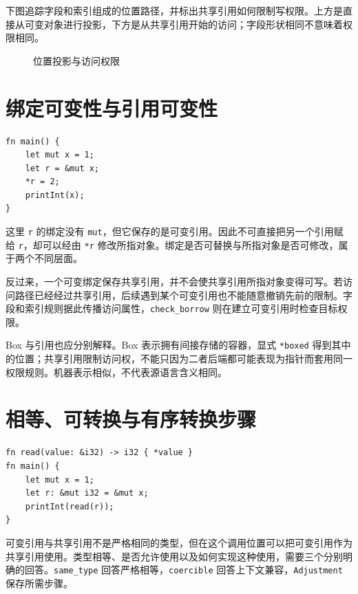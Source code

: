 下图追踪字段和索引组成的位置路径，并标出共享引用如何限制写权限。上方是直接从可变对象进行投影，下方是从共享引用开始的访问；字段形状相同不意味着权限相同。
\begin{figure}[htbp]
\centering
{}
\caption{位置投影与访问权限}
\end{figure}

\section{绑定可变性与引用可变性}
\begin{lstlisting}[language=Rustless]
fn main() {
    let mut x = 1;
    let r = &mut x;
    *r = 2;
    printInt(x);
}
\end{lstlisting}
这里 \lstinline[language=Rustless]|r| 的绑定没有 \lstinline[language=Rustless]|mut|，但它保存的是可变引用。因此不可直接把另一个引用赋给 \lstinline[language=Rustless]|r|，却可以经由 \lstinline[language=Rustless]|*r| 修改所指对象。绑定是否可替换与所指对象是否可修改，属于两个不同层面。

反过来，一个可变绑定保存共享引用，并不会使共享引用所指对象变得可写。若访问路径已经经过共享引用，后续遇到某个可变引用也不能随意撤销先前的限制。字段和索引规则据此传播访问属性，\texttt{check\_borrow} 则在建立可变引用时检查目标权限。

Box 与引用也应分别解释。Box 表示拥有间接存储的容器，显式 \lstinline[language=Rustless]|*boxed| 得到其中的位置；共享引用限制访问权，不能只因为二者后端都可能表现为指针而套用同一权限规则。机器表示相似，不代表源语言含义相同。

\section{相等、可转换与有序转换步骤}
\begin{lstlisting}[language=Rustless]
fn read(value: &i32) -> i32 { *value }
fn main() {
    let mut x = 1;
    let r: &mut i32 = &mut x;
    printInt(read(r));
}
\end{lstlisting}
可变引用与共享引用不是严格相同的类型，但在这个调用位置可以把可变引用作为共享引用使用。类型相等、是否允许使用以及如何实现这种使用，需要三个分别明确的回答。\texttt{same\_type} 回答严格相等，\texttt{coercible} 回答上下文兼容，\texttt{Adjustment} 保存所需步骤。

